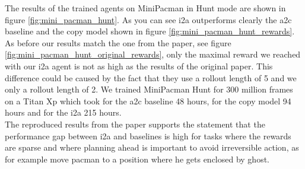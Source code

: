 The results of the trained agents on MiniPacman in Hunt mode are shown in figure \ref{fig:mini_pacman_hunt}. As you can see i2a outperforms clearly the a2c baseline and the copy model shown in figure \ref{fig:mini_pacman_hunt_rewards}.
As before our results match the one from the paper, see figure \ref{fig:mini_pacman_hunt_original_rewards}, only the maximal reward we reached with our i2a agent is not as high as the results of the original paper.
This difference could be caused by the fact that they use a rollout length of 5 and we only a rollout length of 2.
We trained MiniPacman Hunt for 300 million frames on a Titan Xp  which took for the a2c baseline 48 hours, for the copy model 94 hours and for the i2a 215 hours.\\ 


The reproduced results from the paper supports the statement that the performance gap between i2a and baselines is high for tasks where the rewards are sparse and where planning ahead is important to avoid irreversible action, as for example move pacman to a position where he gets enclosed by ghost.






